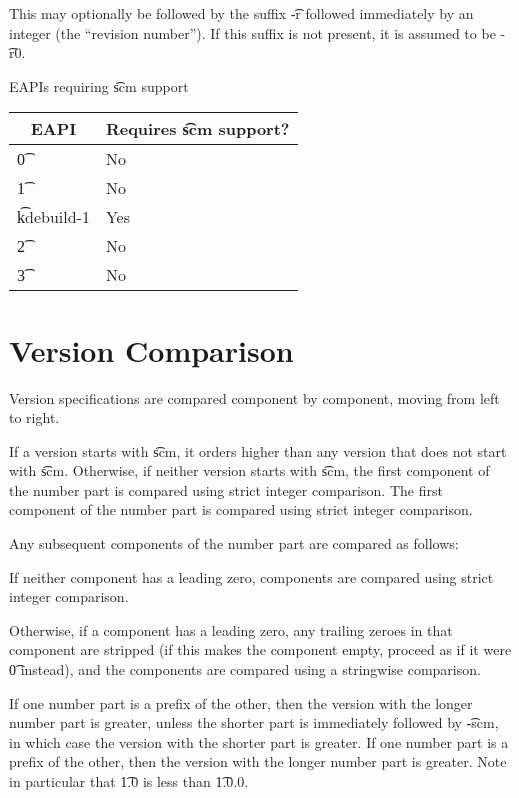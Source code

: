 This may optionally be followed by the suffix \t{-r} followed immediately by an integer (the
``revision number''). If this suffix is not present, it is assumed to be \t{-r0}.

\IFKDEBUILDELSE
{
    \begin{centertable}{EAPIs requiring \t{scm} support} \label{tab:scm-table}
    \begin{tabular}{ l l }
        \toprule
        \multicolumn{1}{c}{\textbf{EAPI}} &
        \multicolumn{1}{c}{\textbf{Requires \t{scm} support?}} \\
        \midrule
    \t{0} & No \\
    \t{1} & No \\
    \t{kdebuild-1} & Yes \\
    \t{2} & No \\
    \t{3} & No \\
    \bottomrule
    \end{tabular}
    \end{centertable}
}{
}

\section{Version Comparison}

Version specifications are compared component by component, moving from left to right.

\IFKDEBUILDELSE
{
    If a version starts with \t{scm}, it orders higher than any version that does not
    start with \t{scm}.  Otherwise, if neither version starts with \t{scm}, the first
    component of the number part is compared using strict integer comparison.
}{
    The first component of the number part is compared using strict integer comparison.
}

Any subsequent components of the number part are compared as follows:

\begin{compactitem}
\item If neither component has a leading zero, components are compared using strict integer
  comparison.
\item Otherwise, if a component has a leading zero, any trailing zeroes in that component
  are stripped (if this makes the component empty, proceed as if it were \t{0} instead),
  and the components are compared using a stringwise comparison.
\end{compactitem}

\IFKDEBUILDELSE
{
    If one number part is a prefix of the other, then the version with the longer number
    part is greater, unless the shorter part is immediately followed by \t{-scm}, in which
    case the version with the shorter part is greater.
}{
    If one number part is a prefix of the other, then the version with the longer number
    part is greater.
}
Note in particular that \t{1.0} is less than \t{1.0.0}.

